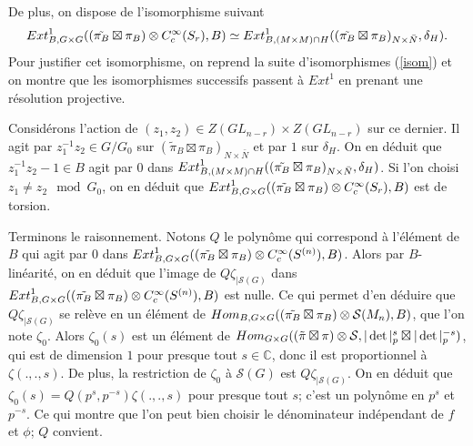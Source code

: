 De plus, on dispose de l'isomorphisme suivant
\begin{equation}
\operatorname{\mathnormal{Ext}}^1_{B, G \times G}((\tilde{\pi_B} \boxtimes \pi_B) \otimes C^\infty_c(S_r), B) \simeq \operatorname{\mathnormal{Ext}}^1_{B, (M \times M) \cap H}((\tilde{\pi_B} \boxtimes \pi_B)_{N \times \bar{N}}, \delta_H).
\end{equation}
Pour justifier cet isomorphisme, on reprend la suite d'isomorphismes (\ref{isom}) et on montre que les isomorphismes successifs passent à $Ext^1$ en prenant une résolution projective.

Considérons l'action de $(z_1,z_2) \in Z(GL_{n-r}) \times Z(GL_{n-r})$ sur ce dernier. Il agit par $z_1^{-1}z_2 \in G/G_0$ sur $(\tilde{\pi}_B \boxtimes \pi_B)_{N \times \bar{N}}$ et par $1$ sur $\delta_H$. On en déduit que $z_1^{-1}z_2-1 \in B$ agit par $0$ dans $\operatorname{\mathnormal{Ext}}^1_{B, (M \times M) \cap H}((\tilde{\pi_B} \boxtimes \pi_B)_{N \times \bar{N}}, \delta_H)$. Si l'on choisi $z_1 \neq z_2 \mod G_0$, on en déduit que $\operatorname{\mathnormal{Ext}}^1_{B, G \times G}((\tilde{\pi_B} \boxtimes \pi_B) \otimes C^\infty_c(S_r), B)$ est de torsion.

Terminons le raisonnement. Notons $Q$ le polynôme qui correspond à l'élément de $B$ qui agit par $0$ dans $\operatorname{\mathnormal{Ext}}^1_{B, G \times G}((\tilde{\pi_B} \boxtimes \pi_B) \otimes C^\infty_c(S^{(n)}), B)$. Alors par $B$-linéarité, on en déduit que l'image de $Q\zeta_{|\mathcal{S}(G)}$ dans $\operatorname{\mathnormal{Ext}}^1_{B, G \times G}((\tilde{\pi_B} \boxtimes \pi_B) \otimes C^\infty_c(S^{(n)}), B)$ est nulle. Ce qui permet d'en déduire que $Q\zeta_{|\mathcal{S}(G)}$ se relève en un élément de $\operatorname{\mathnormal{Hom}}_{B, G \times G}((\tilde{\pi_B} \boxtimes \pi_B) \otimes \mathcal{S}(M_n), B)$, que l'on note $\zeta_0$. Alors $\zeta_0(s)$ est un élément de $\operatorname{\mathnormal{Hom}}_{G \times G} ( (\tilde{\pi} \boxtimes \pi) \otimes \mathcal{S}, |\det|_p^s \boxtimes |\det|_p^{-s})$, qui est de dimension $1$ pour presque tout $s \in \mathbb{C}$, donc il est proportionnel à $\zeta(., ., s)$. De plus, la restriction de $\zeta_0$ à $\mathcal{S}(G)$ est $Q\zeta_{|\mathcal{S}(G)}$. On en déduit que $\zeta_0(s) = Q(p^s, p^{-s})\zeta(.,.,s)$ pour presque tout $s$; c'est un polynôme en $p^s$ et $p^{-s}$. Ce qui montre que l'on peut bien choisir le dénominateur indépendant de $f$ et $\phi$; $Q$ convient.